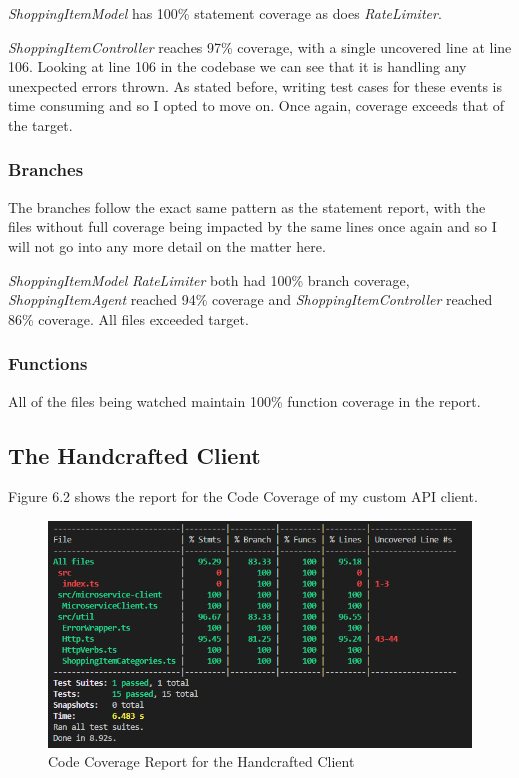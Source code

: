 \textit{ShoppingItemModel} has 100\% statement coverage as does \textit{RateLimiter}.

\textit{ShoppingItemController} reaches 97\% coverage, with a single uncovered line at line 106. Looking at line 106 in the codebase we can see that it is handling any unexpected errors thrown. As stated before, writing test cases for these events is time consuming and so I opted to move on. Once again, coverage exceeds that of the target. 
\subsubsection{Branches}
The branches follow the exact same pattern as the statement report, with the files without full coverage being impacted by the same lines once again and so I will not go into any more detail on the matter here.

\textit{ShoppingItemModel} \textit{RateLimiter} both had 100\% branch coverage, \textit{ShoppingItemAgent} reached 94\% coverage and \textit{ShoppingItemController} reached 86\% coverage. All files exceeded target.

\subsubsection{Functions}
All of the files being watched maintain 100\% function coverage in the report.
\subsection{The Handcrafted Client}
Figure 6.2 shows the report for the Code Coverage of my custom API client.
\begin{figure}[!htb]
\caption{Code Coverage Report for the Handcrafted Client}
\centering
\includegraphics[scale=0.70]{FYP_Dissertation_template/Figures/handcrafted-client-code-coverage.PNG}
\end{figure}
\FloatBarrier

